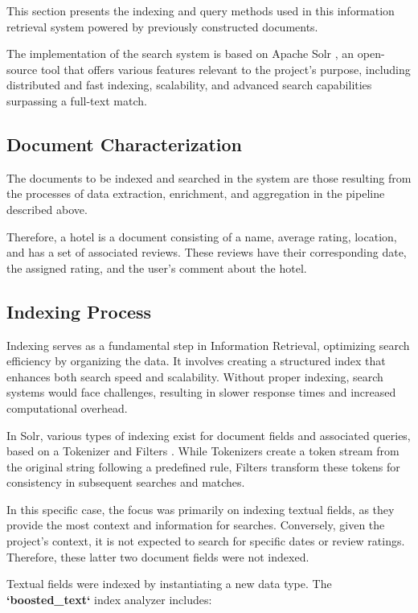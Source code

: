 \documentclass[sigconf]{acmart}
\begin{document}
This section presents the indexing and query methods used in this information retrieval system powered by previously constructed documents. 

The implementation of the search system is based on Apache Solr \cite{Apache_Solr} , an open-source tool that offers various features relevant to the project's purpose, including distributed and fast indexing, scalability, and advanced search capabilities surpassing a full-text match.

\subsection{Document Characterization}

The documents to be indexed and searched in the system are those resulting from the processes of data extraction, enrichment, and aggregation in the pipeline described above.

Therefore, a hotel is a document consisting of a name, average rating, location, and has a set of associated reviews. These reviews have their corresponding date, the assigned rating, and the user's comment about the hotel.

\subsection{ Indexing Process}

Indexing serves as a fundamental step in Information Retrieval, optimizing search efficiency by organizing the data. It involves creating a structured index that enhances both search speed and scalability. Without proper indexing, search systems would face challenges, resulting in slower response times and increased computational overhead.

In Solr, various types of indexing exist for document fields and associated queries, based on a Tokenizer \cite{Solr_Tokenizers} and Filters \cite{Solr_Filters}. While Tokenizers create a token stream from the original string following a predefined rule, Filters transform these tokens for consistency in subsequent searches and matches.
    
In this specific case, the focus was primarily on indexing textual fields, as they provide the most context and information for searches. Conversely, given the project's context, it is not expected to search for specific dates or review ratings. Therefore, these latter two document fields were not indexed.

Textual fields were indexed by instantiating a new data type. The \textbf{`boosted\_text`} index analyzer includes:
\end{document}
